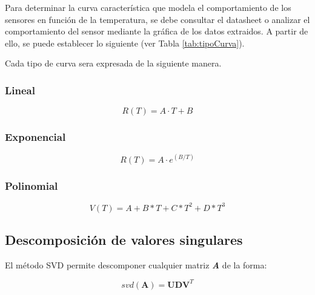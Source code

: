 \documentclass[conference]{IEEEtran}
\begin{document}
Para determinar la curva caracter\'istica que modela el comportamiento de los sensores en funci\'on de la temperatura, se debe consultar el datasheet o analizar el comportamiento del sensor mediante la gr\'afica de los datos extraidos. A partir de ello, se puede establecer lo siguiente (ver Tabla \ref{tab:tipoCurva}).

\begin{table}[h]
	\centering
	\caption{Tipo de curva}
	\label{tab:tipoCurva}
	
\end{table}

Cada tipo de curva sera expresada de la siguiente manera.

\subsubsection{Lineal}

\[
R(T) = A \cdot T + B
\]

\subsubsection{Exponencial}
\[
R(T) = A \cdot e^{(B/T)}
\]

\subsubsection{Polinomial}
\[
V(T) = A + B * T + C * T^2 + D * T^3
\]

\subsection{Descomposici\'on de valores singulares}

El m\'etodo SVD permite descomponer cualquier matriz \textbf{\textit{A}} de la forma:


\[
	svd(\mathbf{A}) = \mathbf{U} \mathbf{D} \mathbf{V}^T
\]
\end{document}
